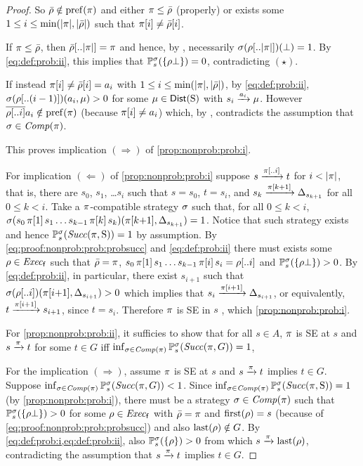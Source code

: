 \begin{proof}
  So $\bar{\rho}\notin\mathrm{pref}(\pi)$ and either $\pi\leq\bar{\rho}$
  (properly) or exists some $1\leq i \leq\min({|}{\pi}{|},{|}{\bar{\rho}}{|})$
  such that $\pi[i]\neq\bar{\rho}[i]$.

  If $\pi\leq\bar{\rho}$, then $\bar{\rho}[..{|}{\pi}{|}]=\pi$ and
  hence, by , necessarily
  $\sigma(\rho[..{|}{\pi}{|}])(\bot) = 1$.  By \cref{eq:def:prob:ii},
  this implies that $\mathbb{P}^\sigma_s(\{\rho\bot\})=0$,
  contradicting $(\star)$.

  If instead $\pi[i]\neq\bar{\rho}[i]=a_i$ with
  $1\leq i \leq\min({|}{\pi}{|},{|}{\bar{\rho}}{|})$, by \cref{eq:def:prob:ii},
  $\sigma(\rho[..(i-1)])(a_i,\mu) > 0$ for some
  $\mu\in\mathsf{Dist}(\operatorname{S})$ with $s_i\xrightarrow{a_i}\mu$.
  However $\overline{\rho[..i]}a_i \notin \mathrm{pref}(\pi)$
  (because $\pi[i]\neq a_i$) which, by
  , contradicts the assumption that
  $\sigma\in\mathit{Comp}(\pi)$.

  This proves implication $(\Rightarrow)$ of \cref{prop:nonprob:prob:i}.

  For implication $(\Leftarrow)$ of \cref{prop:nonprob:prob:i} suppose
  $s\xrightarrow{\pi[..i]}t$ for $i<{|}{\pi}{|}$, that is, there are $s_0$,
  $s_1$, \ldots $s_i$ such that $s=s_0$, $t=s_i$, and
  $s_k\xrightarrow{\pi[k{+}1]}\Delta_{s_{k{+}1}}$ for all $0\leq k < i$.
  Take a $\pi$-compatible strategy $\sigma$ such that, for all
  $0\leq k < i$,
  $\sigma(s_0\,\pi[1]\,s_1\ldots s_{k{-}1}\,\pi[k]\,s_k)(\pi[k{+}1],\Delta_{s_{k{+}1}})=1$.
  Notice that such strategy exists and hence
  $\mathbb{P}^\sigma_s(\mathit{Succ}(\pi,\operatorname{S}))=1$ by assumption.
  By \cref{eq:proof:nonprob:prob:probsucc} and \cref{eq:def:prob:ii}
  there must exists some $\rho\in\mathit{Exec}_{\mathsf{f}}$ such that $\bar{\rho}=\pi$,
  $s_0\,\pi[1]\,s_1\ldots s_{k{-}1}\,\pi[i]\,s_i = \rho[..i]$ and
  $\mathbb{P}^\sigma_s(\{\rho\bot\})>0$.  By \cref{eq:def:prob:ii}, in
  particular, there exist $s_{i{+}1}$ such that
  $\sigma(\rho[..i])(\pi[i{+}1],\Delta_{s_{i{+}1}})> 0$ which
  implies that $s_i\xrightarrow{\pi[i{+}1]}\Delta_{s_{i{+}1}}$, or
  equivalently, $t\xrightarrow{\pi[i{+}1]}s_{i{+}1}$, since $t=s_i$.
  Therefore $\pi$ is SE in $s$ , which \cref{prop:nonprob:prob:i}.

  For \cref{prop:nonprob:prob:ii}, it sufficies to show that for all
  $s\in A$, $\pi$ is SE at $s$ and $s \xrightarrow{\pi} t$ for some
  $t\in G$ iff
  $\inf_{\sigma\in\mathit{Comp}(\pi)}\mathbb{P}^\sigma_s(\mathit{Succ}(\pi,G))=1$,

  For the implication $(\Rightarrow)$, assume $\pi$ is SE at $s$ and
  $s \xrightarrow{\pi} t$ implies $t\in G$.
  Suppose
  $\inf_{\sigma\in\mathit{Comp}(\pi)}\mathbb{P}^\sigma_s(\mathit{Succ}(\pi,G))<1$.
  Since
  $\inf_{\sigma\in\mathit{Comp}(\pi)}\mathbb{P}^\sigma_s(\mathit{Succ}(\pi,\operatorname{S}))=1$ (by
  \cref{prop:nonprob:prob:i}), there must be a strategy
  $\sigma\in\mathit{Comp}(\pi)$ such that
  $\mathbb{P}^\sigma_s(\{\rho\bot\})>0$ for some $\rho\in\mathit{Exec}_{\mathsf{f}}$ with
  $\bar{\rho}=\pi$ and $\mathrm{first}(\rho)=s$ (because of
  \cref{eq:proof:nonprob:prob:probsucc}) and also $\mathrm{last}(\rho)\notin G$.
  By \cref{eq:def:prob:i,eq:def:prob:ii}, also
  $\mathbb{P}^\sigma_s(\{\rho\})>0$ from which $s\xrightarrow{\pi}\mathrm{last}(\rho)$,
  contradicting the assumption that $s \xrightarrow{\pi} t$ implies
  $t\in G$.


\end{proof}

